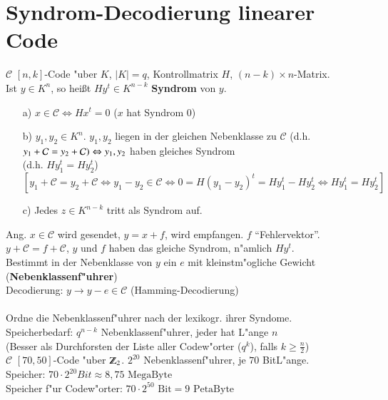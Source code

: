 \section{Syndrom-Decodierung linearer Code}
$\mathcal{C}$ $[n,k]$-Code "uber $K$, $\left| K \right| = q$, Kontrollmatrix $H$, $(n-k) \times n$-Matrix.\\
Ist $y \in K^n$, so hei\ss t $Hy^t \in K^{n-k}$ \textbf{Syndrom} von $y$.
\begin{itemize}
	\item[a)]	$x \in \mathcal{C} \Leftrightarrow Hx^t = 0$ ($x$ hat Syndrom $0$)
	\item[b)] $y_1,y_2 \in K^n$. $y_1,y_2$ liegen in der gleichen Nebenklasse zu $\mathcal{C}$ (d.h. $y_1 + \mathcal{C} = y_2 + \mathcal{C})\\ \Leftrightarrow y_1,y_2$ haben gleiches Syndrom \\
	(d.h. $Hy_1^t = Hy_2^t$)
	\[
		[y_1 + \mathcal{C} = y_2 + \mathcal{C} \Leftrightarrow y_1 - y_2 \in \mathcal{C} \Leftrightarrow 0 = H(y_1 - y_2)^t = Hy_1^t - Hy_2^t \Leftrightarrow Hy_1^t = Hy_2^t]
	\]
	\item[c)] Jedes $z \in K^{n-k}$ tritt als Syndrom auf.	 
\end{itemize}
Ang. $x \in \mathcal{C}$ wird gesendet, $y=x+f$, wird empfangen. $f$ "`Fehlervektor"'.\\
$y + \mathcal{C} = f + \mathcal{C}$, $y$ und $f$ haben das gleiche Syndrom, n"amlich $Hy^t$.\\
Bestimmt in der Nebenklasse von $y$ ein $e$ mit kleinstm"ogliche Gewicht (\textbf{Nebenklassenf"uhrer}) \\
Decodierung: $y \rightarrow y - e \in \mathcal{C}$ (Hamming-Decodierung)\\
\\
Ordne die Nebenklassenf"uhrer nach der lexikogr. ihrer Syndome. \\
Speicherbedarf: $q^{n-k}$ Nebenklassenf"uhrer, jeder hat L"ange $n$ \\
(Besser als Durchforsten der Liste aller Codew"orter ($q^k$), falls $k \geq \frac{n}{2}$)\\
$\mathcal{C}$ $[70,50]$-Code "uber $\Z_2$. $2^{20}$ Nebenklassenf"uhrer, je $70$ BitL"ange.\\
Speicher: $70 \cdot 2^{20} Bit \approx 8,75 \text{ MegaByte}$ \\
Speicher f"ur Codew"orter: $70 \cdot 2^{50} \text{ Bit} = 9 \text{ PetaByte}$

